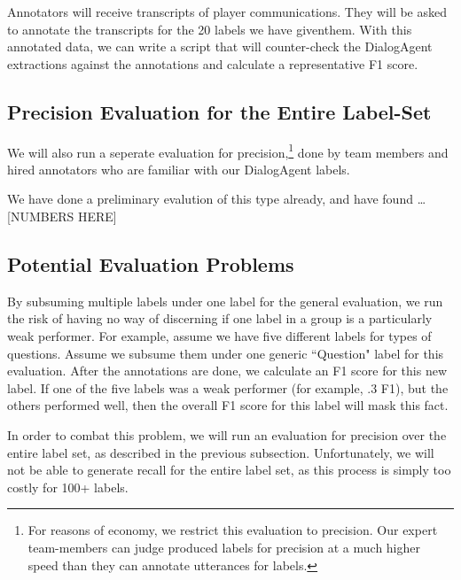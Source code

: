 Annotators will receive transcripts of player communications. They will be
asked to annotate the transcripts for the 20 labels we have giventhem. With
this annotated data, we can write a script that will counter-check the
DialogAgent extractions against the annotations and calculate a representative
F1 score.



\subsection{Precision Evaluation for the Entire Label-Set}

We will also run a seperate evaluation for precision,\footnote{For reasons of
economy, we restrict this evaluation to precision. Our expert team-members can
judge produced labels for precision at a much higher speed than they can
annotate utterances for labels.} done by team members and hired annotators who
are familiar with our DialogAgent labels.

We have done a preliminary evalution of this type already, and have found \ldots [NUMBERS HERE]

\subsection{Potential Evaluation Problems}

By subsuming multiple labels under one label for the general evaluation, we run
the risk of having no way of discerning if one label in a group is a
particularly weak performer. For example, assume we have five different labels
for types of questions. Assume we subsume them under one generic ``Question"
label for this evaluation. After the annotations are done, we calculate an F1
score for this new label. If one of the five labels was a weak performer (for
example, .3 F1), but the others performed well, then the overall F1 score for
this label will mask this fact. 

In order to combat this problem, we will run an evaluation for precision over
the entire label set, as described in the previous subsection. Unfortunately,
we will not be able to generate recall for the entire label set, as this
process is simply too costly for 100+ labels.
